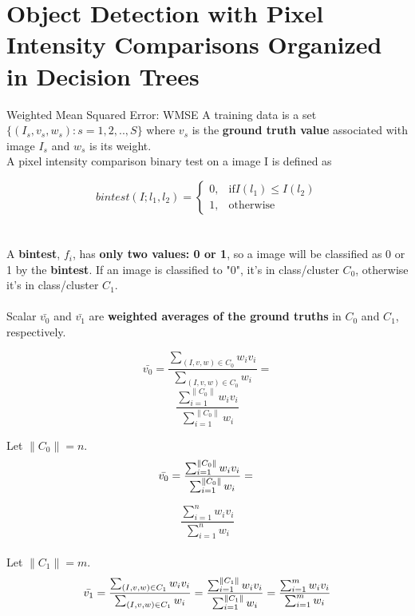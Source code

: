 \section{Object Detection with Pixel Intensity Comparisons Organized in Decision Trees}
\cite{DBLPjournalscorrabs}

\begin{compactitem}
\item{Weighted Mean Squared Error: WMSE}
A training data is a set $\{(I_s,v_s,w_s) : s=1,2,..,S\}$
where $v_s$ is the \textbf{ground truth value} associated with image $I_s$ and $w_s$ is its weight.
\\ A pixel intensity comparison binary test on a image I is defined as

\begin{equation}
\label{eq:bintest}
    bintest(I;l_1,l_2)=
\begin{cases}
    0,		& \text{if} I(l_1)\leq I(l_2)\\
    1,      & \text{otherwise}
\end{cases}
\end{equation}\\
\\ A \textbf{bintest}, $f_i$, has \textbf{only two values: 0 or 1}, so a image will be classified as 0 or 1 by the \textbf{bintest}. If an image is classified to "0", it's in class/cluster $C_0$, otherwise it's in class/cluster $C_1$. \\
\\ Scalar $\bar{v_0}$ and $\bar{v_1}$ are \textbf{weighted averages of the ground truths} in $C_0$ and $C_1$, respectively.

\begin{equation}
\label{eq:WAGT0}
\bar{v_0}=\frac{\sum\nolimits_{(I,v,w) \in C_0} w_i v_i} { \sum\nolimits_{(I,v,w) \in C_0} w_i} =
\end{equation}
\[
\frac{\sum_{i=1}^{\| C_0 \|}  w_i v_i}
{\sum_{i=1}^{\| C_0 \|}  w_i}
\]

Let $\| C_{0} \|=n$.\\
\[
\bar{v_0}=\frac{\sum_{i=1}^{\| C_0 \|}  w_i v_i}
{\sum_{i=1}^{\| C_0 \|}  w_i}=\\
\]

\begin{equation}
\label{eq:WAGT0-1}
\frac{\sum_{i=1}^{n}  w_i v_i}
{\sum_{i=1}^{n}  w_i}
\end{equation}
\\

Let $\| C_{1} \|=m$.\\
\begin{equation}
\label{eq:WAGT1}
\bar{v_1}=\frac{\sum\nolimits_{(I,v,w) \in C_1} w_i v_i} { \sum\nolimits_{(I,v,w) \in C_1} w_i} =
\frac{\sum_{i=1}^{\| C_1 \|}  w_i v_i}
{\sum_{i=1}^{\| C_1 \|}  w_i}=\\
\frac{\sum_{i=1}^{m}  w_i v_i}
{\sum_{i=1}^{m}  w_i}
\end{equation}
\\


\end{compactitem}
